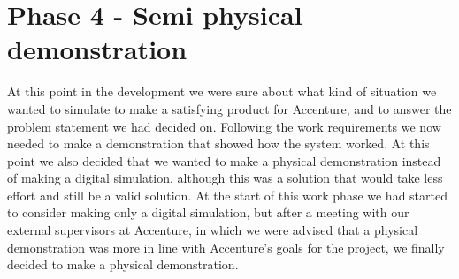 \section{Phase 4 - Semi physical demonstration}

At this point in the development we were sure about what kind of situation we wanted to simulate to make a satisfying product for Accenture, and to answer the problem statement we had decided on. Following the work requirements we now needed to make a demonstration that showed how the system worked. At this point we also decided that we wanted to make a physical demonstration instead of making a digital simulation, although this was a solution that would take less effort and still be a valid solution. At the start of this work phase we had started to consider making only a digital simulation, but after a meeting with our external supervisors at Accenture, in which we were advised that a physical demonstration was more in line with Accenture's goals for the project, we finally decided to make a physical demonstration. 




\clearpage
%
%

